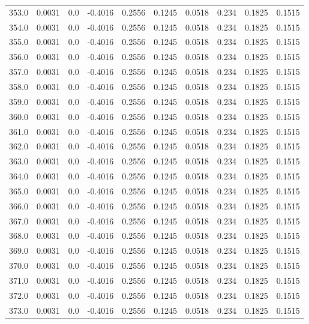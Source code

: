 \begin{longtable}{lrrrrrrrrr}
353.0 & 0.0031 & 0.0 & -0.4016 & 0.2556 & 0.1245 & 0.0518 & 0.234 & 0.1825 & 0.1515 \\
354.0 & 0.0031 & 0.0 & -0.4016 & 0.2556 & 0.1245 & 0.0518 & 0.234 & 0.1825 & 0.1515 \\
355.0 & 0.0031 & 0.0 & -0.4016 & 0.2556 & 0.1245 & 0.0518 & 0.234 & 0.1825 & 0.1515 \\
356.0 & 0.0031 & 0.0 & -0.4016 & 0.2556 & 0.1245 & 0.0518 & 0.234 & 0.1825 & 0.1515 \\
357.0 & 0.0031 & 0.0 & -0.4016 & 0.2556 & 0.1245 & 0.0518 & 0.234 & 0.1825 & 0.1515 \\
358.0 & 0.0031 & 0.0 & -0.4016 & 0.2556 & 0.1245 & 0.0518 & 0.234 & 0.1825 & 0.1515 \\
359.0 & 0.0031 & 0.0 & -0.4016 & 0.2556 & 0.1245 & 0.0518 & 0.234 & 0.1825 & 0.1515 \\
360.0 & 0.0031 & 0.0 & -0.4016 & 0.2556 & 0.1245 & 0.0518 & 0.234 & 0.1825 & 0.1515 \\
361.0 & 0.0031 & 0.0 & -0.4016 & 0.2556 & 0.1245 & 0.0518 & 0.234 & 0.1825 & 0.1515 \\
362.0 & 0.0031 & 0.0 & -0.4016 & 0.2556 & 0.1245 & 0.0518 & 0.234 & 0.1825 & 0.1515 \\
363.0 & 0.0031 & 0.0 & -0.4016 & 0.2556 & 0.1245 & 0.0518 & 0.234 & 0.1825 & 0.1515 \\
364.0 & 0.0031 & 0.0 & -0.4016 & 0.2556 & 0.1245 & 0.0518 & 0.234 & 0.1825 & 0.1515 \\
365.0 & 0.0031 & 0.0 & -0.4016 & 0.2556 & 0.1245 & 0.0518 & 0.234 & 0.1825 & 0.1515 \\
366.0 & 0.0031 & 0.0 & -0.4016 & 0.2556 & 0.1245 & 0.0518 & 0.234 & 0.1825 & 0.1515 \\
367.0 & 0.0031 & 0.0 & -0.4016 & 0.2556 & 0.1245 & 0.0518 & 0.234 & 0.1825 & 0.1515 \\
368.0 & 0.0031 & 0.0 & -0.4016 & 0.2556 & 0.1245 & 0.0518 & 0.234 & 0.1825 & 0.1515 \\
369.0 & 0.0031 & 0.0 & -0.4016 & 0.2556 & 0.1245 & 0.0518 & 0.234 & 0.1825 & 0.1515 \\
370.0 & 0.0031 & 0.0 & -0.4016 & 0.2556 & 0.1245 & 0.0518 & 0.234 & 0.1825 & 0.1515 \\
371.0 & 0.0031 & 0.0 & -0.4016 & 0.2556 & 0.1245 & 0.0518 & 0.234 & 0.1825 & 0.1515 \\
372.0 & 0.0031 & 0.0 & -0.4016 & 0.2556 & 0.1245 & 0.0518 & 0.234 & 0.1825 & 0.1515 \\
373.0 & 0.0031 & 0.0 & -0.4016 & 0.2556 & 0.1245 & 0.0518 & 0.234 & 0.1825 & 0.1515 \\

\end{longtable}
